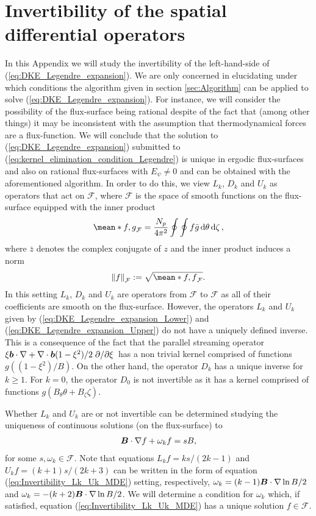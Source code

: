 
\section{Invertibility of the spatial differential operators}
\label{sec:Appendix_Invertibility} 
In this Appendix we will study
the invertibility of the left-hand-side of (\ref{eq:DKE_Legendre_expansion}). We are only concerned in elucidating under which conditions the algorithm given in section \ref{sec:Algorithm} can be applied to solve (\ref{eq:DKE_Legendre_expansion}). For instance, we will consider the possibility of the flux-surface being rational despite of the fact that (among other things) it may be inconsistent with the assumption that thermodynamical forces are a flux-function. We will conclude that the solution to (\ref{eq:DKE_Legendre_expansion}) submitted to (\ref{eq:kernel_elimination_condition_Legendre}) is unique in ergodic flux-surfaces and also on rational flux-surfaces with $E_\psi\ne 0$ and can be obtained with the aforementioned algorithm. In order to do this, we view $L_k$, $D_k$ and $U_k$ as operators that act on $\mathcal{F}$, where $\mathcal{F}$ is the space of smooth functions on the flux-surface equipped with the inner product
%
\begin{align}
	\mean*{f,g}_{\mathcal{F}}=\frac{N_p}{4\pi^2}\oint\oint f\bar{g}\dd{\theta}\dd{\zeta},
	\label{eq:Fourier_inner_product}
\end{align}
where $\bar{z}$ denotes the complex conjugate of $z$ and the inner product induces a norm 
%
\begin{align}
	\norm{f}_{\mathcal{F}}:=\sqrt{\mean*{f,f}_{\mathcal{F}}}.
	\label{eq:Fourier_norm}
\end{align}
In this setting $L_k$, $D_k$ and $U_k$ are operators from $\mathcal{F}$ to $\mathcal{F}$ as all of their coefficients are smooth on the flux-surface. However, the operators $L_k$ and $U_k$ given by (\ref{eq:DKE_Legendre_expansion_Lower}) and (\ref{eq:DKE_Legendre_expansion_Upper}) do not have a uniquely defined inverse. This is a consequence of the fact that the parallel streaming operator $\xi \vb*{b}\cdot \nabla+\nabla \cdot \vb*{b} {(1-\xi^2)}/{2}  \pdv*{\xi}$ has a non trivial kernel comprised of functions $g((1-\xi^2)/B)$. On the other hand, the operator $D_k$ has a unique inverse for $k\ge 1$. For $k=0$, the operator $D_0$ is not invertible as it has a kernel comprised of functions $g(B_\theta\theta + B_\zeta\zeta)$.

Whether $L_k$ and $U_k$ are or not invertible can be determined studying the uniqueness of continuous solutions (on the flux-surface) to
\begin{align}
	 \vb*{B}\cdot \nabla f + \omega_k f = s B,
	 \label{eq:Invertibility_Lk_Uk_MDE}
\end{align}
for some $s,\omega_k\in\mathcal{F}$. Note that equations $L_k f = ks/(2k-1)$ and $U_k f =(k+1)s/(2k+3)$ can be written in the form of equation (\ref{eq:Invertibility_Lk_Uk_MDE}) setting, respectively, $\omega_k=(k-1)\vb*{B}\cdot\nabla \ln B /2$ and $\omega_k=-(k+2)\vb*{B}\cdot\nabla \ln B /2$. We will determine a condition for $\omega_k$ which, if satisfied, equation (\ref{eq:Invertibility_Lk_Uk_MDE}) has a unique solution $f\in\mathcal{F}$.

